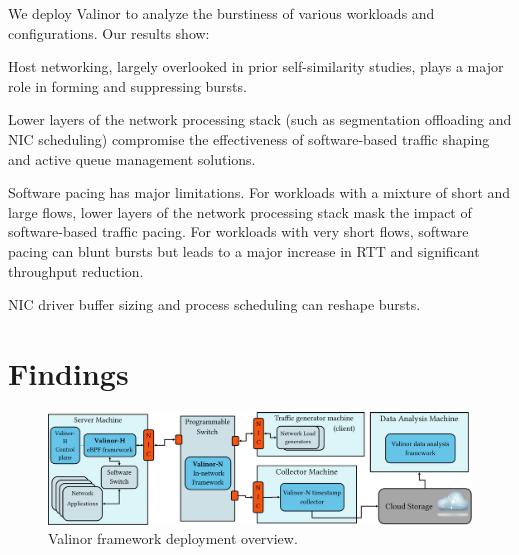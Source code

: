 We deploy Valinor to analyze the burstiness of various workloads and configurations.
Our results show:
\begin{compactitem}
    \item Host networking, largely overlooked in prior self-similarity studies, plays a major role in forming and suppressing bursts.
    
    \item Lower layers of the network processing stack (such as segmentation offloading and NIC scheduling) compromise the effectiveness of software-based traffic shaping and active queue management solutions.
    
    \item Software pacing has major limitations. For workloads with a mixture of short and large flows, lower layers of the network processing stack mask the impact of software-based traffic pacing. For workloads with very short flows, software pacing can blunt bursts but leads to a major increase in RTT and significant throughput reduction. 
    
    \item NIC driver buffer sizing and process scheduling can reshape bursts.
\end{compactitem}


\section{Findings}
\label{sec:valinor-findings}
\begin{figure}[t]
    \centering
    \includegraphics[width=0.9\linewidth]{figs/setup-crop.pdf}
     \vspace{-3mm}
    \caption{\small{Valinor framework deployment overview.}}
	\label{fig:setup}
 \vspace{-2mm}
\end{figure}


